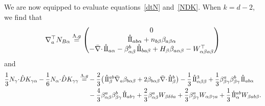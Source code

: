 \documentclass[pdftex]{sigma}
\numberwithin{equation}{section}
\newcommand{\IIo}{\hspace{0.4mm}\mathring{\rm{ I\hspace{-.2mm} I}}{\hspace{.0mm}}}
\newcommand{\hd }{\hat{D}}
\renewcommand{\=}{\stackrel \Lambda =}
\newcommand{\csdot}{\hspace{-0.75mm} \cdot \hspace{-0.75mm}}
\begin{document}
We are now equipped to evaluate equations~\eqref{dtN} and~\eqref{NDK}. When $k=d-2$, we find that
\begin{align} \label{dtNeval}
\nabla^\top_a N_{B \alpha}
\stackrel{\Lambda,g}{=} \begin{pmatrix}
0\\
\IIo_{ab \alpha} + n_{b \beta} \beta_{a \beta \alpha} \\
-\bar{\nabla} \csdot \IIo_{a \alpha} - \beta^b_{\alpha \beta} \IIo_{ba \beta} + H_{\beta} \beta_{a \alpha \beta} - W_{\alpha \beta a \beta}^\top
\end{pmatrix}
\end{align}
and
\begin{align*}
\frac{1}{3} N_{\gamma} \csdot \hd K_{\gamma \alpha} - \frac{1}{6} N_{\alpha} \csdot \hd K_{\gamma \gamma}\stackrel{\Lambda,g}{=}& -\frac{2}{3} \bigl(\IIo^{ab}_{\beta} \bar{\nabla}_a \beta_{b \alpha \beta} + 2 \beta_{b \alpha \beta} \bar{\nabla} \csdot \IIo^b_{\beta}\bigr) - \frac{1}{3} \IIo^3_{\alpha \beta \beta} + \frac{1}{3} \beta^a_{\beta \gamma} \beta^b_{\beta \gamma} \IIo_{ab \alpha} \\
&{}- \frac{4}{3} \beta^a_{\alpha \beta} \beta^b_{\beta \gamma} \IIo_{ab \gamma} + \frac{2}{3} \beta^a_{\alpha \beta} W_{\beta \delta \delta a} + \frac{2}{3} \beta^a_{\beta \gamma} W_{\alpha \beta \gamma a} + \frac{1}{3} \IIo^{ab}_{\alpha} W_{\beta ab \beta} .
\end{align*}
\end{document}
